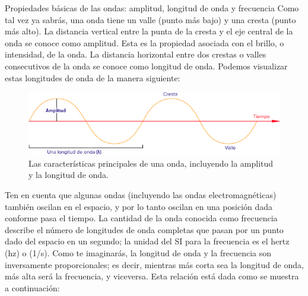 \begin{sectionbox}{Propiedades básicas de las ondas: amplitud, longitud de onda y frecuencia}
Como tal vez ya sabrás, una onda tiene un valle (punto más bajo) y una cresta (punto más alto). La distancia vertical entre la punta de la cresta y el eje central de la onda se conoce como amplitud. Esta es la propiedad asociada con el brillo, o intensidad, de la onda. La distancia horizontal entre dos crestas o valles consecutivos de la onda se conoce como longitud de onda. Podemos visualizar estas longitudes de onda de la manera siguiente:

\begin{figure}[H]
    \centering
    \includegraphics[width=0.7\linewidth]{../images/67a8bb901b1aae76df573aa510cf0ee6c6229496}
    \caption{Las características principales de una onda, incluyendo la amplitud y la longitud de onda.}
    \label{fig:67a8bb901b1aae76df573aa510cf0ee6c6229496}
\end{figure}

Ten en cuenta que algunas ondas (incluyendo las ondas electromagnéticas) también oscilan en el espacio, y por lo tanto oscilan en una posición dada conforme pasa el tiempo. La cantidad de la onda conocida como frecuencia describe el número de longitudes de onda completas que pasan por un punto dado del espacio en un segundo; la unidad del SI para la frecuencia es el hertz (hz) o (1/s).
Como te imaginarás, la longitud de onda y la frecuencia son inversamente proporcionales; es decir, mientras más corta sea la longitud de onda, más alta será la frecuencia, y viceversa. Esta relación está dada como se muestra a continuación:

\begin{multicols}{2}
    
    
\end{multicols}
\end{sectionbox}